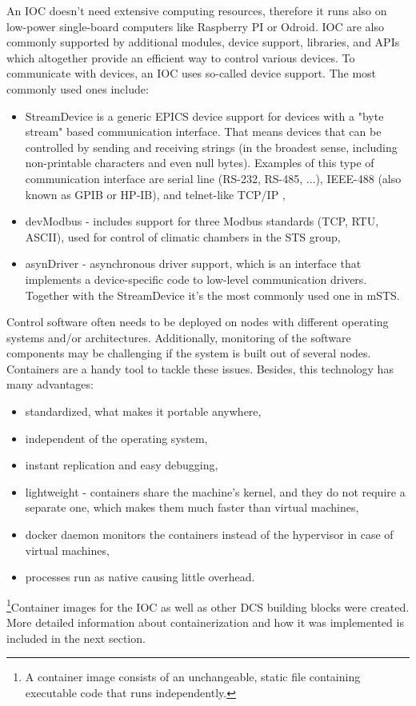 An \gls{IOC} doesn't need extensive computing resources, therefore it runs also on low-power single-board computers like Raspberry PI or Odroid. 
 \gls{IOC} are also commonly supported by additional modules, device support, libraries, and \glspl{API} which altogether provide an efficient way to control various devices.
To communicate with devices, an \gls{IOC} uses so-called device support. The most commonly used ones include:
\begin{itemize}
    \item StreamDevice is a generic EPICS device support for devices with a "byte stream" based communication interface. That means devices that can be controlled by sending and receiving strings (in the broadest sense, including non-printable characters and even null bytes). Examples of this type of communication interface are serial line (RS-232, RS-485, ...), IEEE-488 (also known as GPIB or HP-IB), and telnet-like TCP/IP \cite{StreamDevice},
    \item devModbus \cite{modbus} - includes support for three Modbus standards (TCP, RTU, ASCII), used for control of climatic chambers in the \gls{STS} group,
    \item asynDriver \cite{asyn} - asynchronous driver support, which is an interface that implements a device-specific code to low-level communication drivers. Together with the StreamDevice it's the most commonly used one in \gls{mSTS}. 
\end{itemize}

Control software often needs to be deployed on nodes with different operating systems and/or architectures. Additionally, monitoring of the software components may be challenging if the system is built out of several nodes. Containers are a handy tool to tackle these issues. 
Besides, this technology has many advantages:
\begin{itemize}
    \item standardized, what makes it portable anywhere,
    \item independent of the operating system,
    \item instant replication and easy debugging,
    \item lightweight - containers share the machine's kernel, and they do not require a separate one, which makes them much faster than virtual machines,
    \item docker daemon monitors the containers instead of the hypervisor in case of virtual machines,
    \item processes run as native causing little overhead.
\end{itemize}

\footnote{A container image consists of an unchangeable, static file containing executable code that runs independently.}{Container images} for the \gls{IOC} as well as other \gls{DCS} building blocks were created. More detailed information about containerization and how it was implemented is included in the next section.
 
